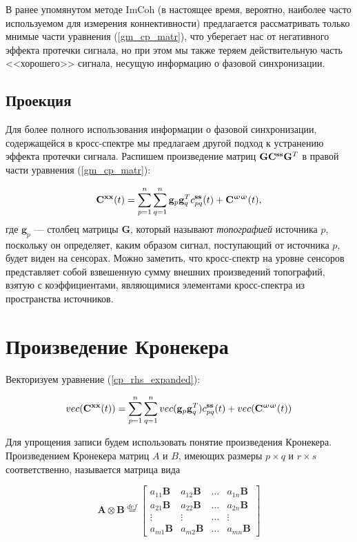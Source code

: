 В ранее упомянутом методе ImCoh (в настоящее время, вероятно,
наиболее часто используемом для измерения коннективности)
предлагается рассматривать только мнимые части уравнения (\ref{gm_cp_matr}),
что уберегает нас от негативного эффекта протечки сигнала,
но при этом мы также теряем действительную часть <<хорошего>> сигнала, несущую
информацию о фазовой синхронизации.

\subsection{Проекция}

Для более полного использования информации о фазовой синхронизации, содержащейся в кросс-спектре
мы предлагаем другой подход к устранению эффекта протечки сигнала.
Распишем  произведение матриц $\mathbf{G} \mathbf{C}^{\mathbf{s s}} \mathbf{G}^T$ в правой части уравнения (\ref{gm_cp_matr}):

\begin{gather}
    \mathbf{C}^{\mathbf{x x}}(t) = \sum\limits_{p=1}^n\sum\limits_{q=1}^n\mathbf{g}_p\mathbf{g}_q^T c_{pq}^{\mathbf{ss}}(t) + \mathbf{C}^{\mathbf{\upomega \upomega}}(t),
    \label{cp_rhs_expanded}
\end{gather}
где $\mathbf{g}_p$ --- столбец матрицы $\mathbf{G}$, который называют \emph{топографией} источника $p$,
поскольку он определяет, каким образом сигнал, поступающий от источника $p$, будет виден на сенсорах.
Можно заметить, что кросс-спектр на уровне сенсоров представляет собой взвешенную сумму внешних произведений топографий,
взятую с коэффициентами, являющимися элементами кросс-спектра из пространства источников.

\section{Произведение Кронекера}
Векторизуем уравнение (\ref{cp_rhs_expanded}):

\begin{gather}
    vec(\mathbf{C}^{\mathbf{x x}}(t)) = \sum\limits_{p=1}^n\sum\limits_{q=1}^n vec(\mathbf{g}_p\mathbf{g}_q^T) c_{pq}^{\mathbf{ss}}(t) + vec(\mathbf{C}^{\mathbf{\upomega \upomega}}(t))
    \label{cp_rhs_vec}
\end{gather}

Для упрощения записи будем использовать понятие произведения Кронекера.
Произведением Кронекера матриц $A$ и $B$, имеющих размеры $p\times q$ и $r\times s$ соответственно, называется матрица вида

\begin{equation}
    \mathbf{A} \otimes \mathbf{B} \stackrel{def}{=}
    \begin{bmatrix}
        a_{11} \mathbf{B} & a_{12} \mathbf{B} & \dots & a_{1n} \mathbf{B} \\
        a_{21} \mathbf{B} & a_{22} \mathbf{B} & \dots & a_{2n} \mathbf{B} \\
        \vdots            & \vdots            & \dots & \vdots            \\
        a_{m1} \mathbf{B} & a_{m2} \mathbf{B} & \dots & a_{mn} \mathbf{B}
        \label{kron_def}
     \end{bmatrix}
\end{equation}

